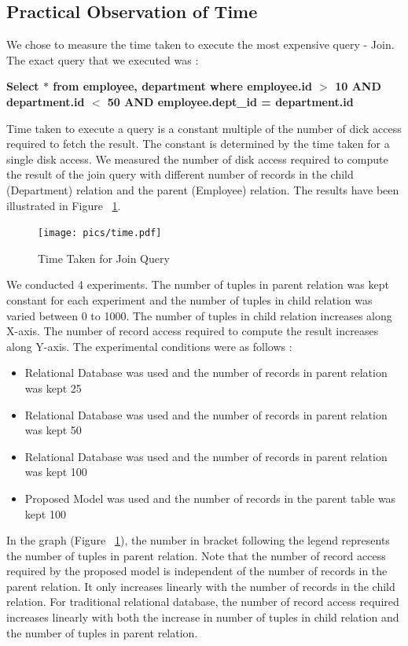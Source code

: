 \documentclass[12pt, oneside]{book}
\begin{document}
\subsection{Practical Observation of Time}
We chose to measure the time taken to execute the most expensive query - Join. The exact query that we executed was : \\
\begin{center}
 \textbf{Select $*$ from employee, department where employee.id $>$ 10 AND \\
 department.id $<$ 50 AND employee.dept\_id = department.id}
\end{center}
Time taken to execute a query is a constant multiple of the number of dick access required to fetch the result. The constant is determined by the time taken for a single disk access. We measured the number of disk access required to compute the result of the join query with different number of records in the child (Department) relation and the parent (Employee) relation. The results have been illustrated in Figure ~\ref{fig:timeresult}.
\begin{figure}[ht]
 \centering
 \texttt{[image: pics/time.pdf]}
 \caption{Time Taken for Join Query}
 \label{fig:timeresult}
\end{figure}
We conducted 4 experiments. The number of tuples in parent relation was kept constant for each experiment and the number of tuples in child relation was varied between 0 to 1000. The number of tuples in child relation increases along X-axis. The number of record access required to compute the result increases along Y-axis. The experimental conditions were as follows :
\begin{itemize}
 \item Relational Database was used and the number of records in parent relation was kept 25
 \item Relational Database was used and the number of records in parent relation was kept 50
 \item Relational Database was used and the number of records in parent relation was kept 100
 \item Proposed Model was used and the number of records in the parent table was kept 100
\end{itemize}
In the graph (Figure ~\ref{fig:timeresult}), the number in bracket following the legend represents the number of tuples in parent relation. Note that the number of record access required by the proposed model is independent of the number of records in the parent relation. It only increases linearly with the number of records in the child relation. For traditional relational database, the number of record access required increases linearly with both the increase in number of tuples in child relation and the number of tuples in parent relation.
\end{document}
